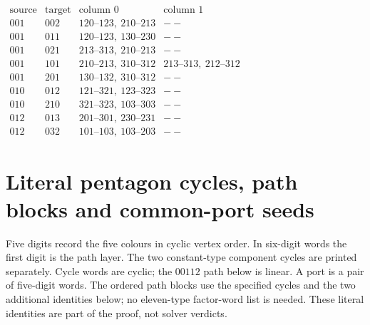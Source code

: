\documentclass[11pt]{article}
\theoremstyle{remark}
\numberwithin{equation}{section}
\numberwithin{table}{section}
\begin{document}
\begin{table}[!htbp]
\centering\small
\renewcommand{\arraystretch}{1.15}
\caption{Two safe common edges for each representative good-boundary interface.}
\label{tab:path232-safe-edges}
$\begin{array}{c|c|l|l}
\text{source}&\text{target}&\text{column }0&\text{column }1\\\hline
001&002&120\text{--}123,\ 210\text{--}213&--\\
001&011&120\text{--}123,\ 130\text{--}230&--\\
001&021&213\text{--}313,\ 210\text{--}213&--\\
001&101&210\text{--}213,\ 310\text{--}312&213\text{--}313,\ 212\text{--}312\\
001&201&130\text{--}132,\ 310\text{--}312&--\\
010&012&121\text{--}321,\ 123\text{--}323&--\\
010&210&321\text{--}323,\ 103\text{--}303&--\\
012&013&201\text{--}301,\ 230\text{--}231&--\\
012&032&101\text{--}103,\ 103\text{--}203&--
\end{array}$
\end{table}
\clearpage
\section{Literal pentagon cycles, path blocks and common-port seeds}
\label{app:pentagon-factor-words}
Five digits record the five colours in cyclic vertex order. In six-digit
words the first digit is the path layer. The two constant-type component
cycles are printed separately. Cycle words are cyclic; the
$00112$ path below is linear. A port is a pair of five-digit words.
The ordered path blocks use the specified cycles and the two
additional identities below; no eleven-type factor-word list is needed.
These literal identities are part of the proof, not solver verdicts.
\end{document}
